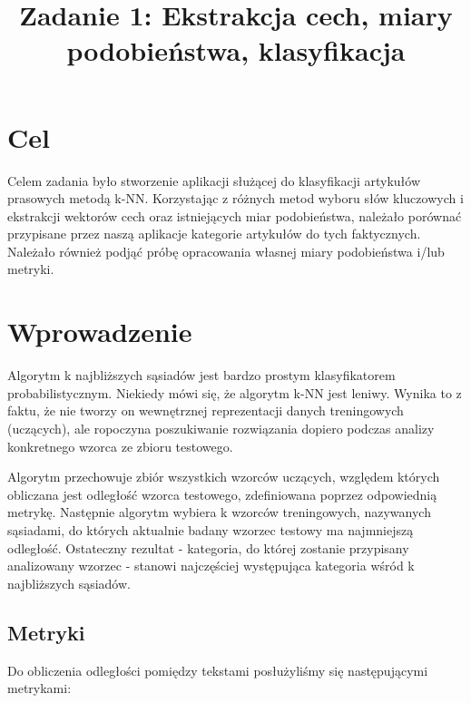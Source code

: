 \documentclass{classrep}
\author{
\studentinfo{Mateusz Walczak}{216911} \and
\studentinfo{Konrad Kajszczak}{216790}
}
\title{Zadanie 1: Ekstrakcja cech, miary podobieństwa, klasyfikacja}
\begin{document}
\maketitle

\section{Cel}
{Celem zadania było stworzenie aplikacji służącej do klasyfikacji artykułów prasowych metodą k-NN. Korzystając z różnych metod
wyboru słów kluczowych i ekstrakcji wektorów cech oraz istniejących miar podobieństwa, należało porównać przypisane przez naszą aplikacje kategorie artykułów do tych faktycznych. Należało również podjąć próbę opracowania własnej miary podobieństwa i/lub metryki.}

\section{Wprowadzenie}
 Algorytm k najbliższych sąsiadów jest bardzo prostym klasyfikatorem probabilistycznym. Niekiedy mówi się, że algorytm k-NN jest leniwy. Wynika to z faktu, że nie tworzy on wewnętrznej reprezentacji danych treningowych (uczących), ale ropoczyna poszukiwanie rozwiązania dopiero podczas analizy konkretnego wzorca ze zbioru testowego. \newline

Algorytm przechowuje zbiór wszystkich wzorców uczących, względem których obliczana jest odległość wzorca testowego, zdefiniowana poprzez odpowiednią metrykę. Następnie algorytm wybiera k wzorców treningowych, nazywanych sąsiadami, do których aktualnie badany wzorzec testowy ma najmniejszą odległość. Ostateczny rezultat - kategoria, do której zostanie przypisany analizowany wzorzec - stanowi najczęściej występująca kategoria wśród k najbliższych sąsiadów.

\subsection{Metryki}

Do obliczenia odległości pomiędzy tekstami posłużyliśmy się następującymi metrykami:
\end{document}
